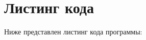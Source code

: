 \section*{Листинг кода}
Ниже представлен листинг кода программы:
\begin{figure}[h]
	\label{ris:image1}
\end{figure}
\begin{figure}[h]
	\label{ris:image1}
\end{figure}
\newpage
\begin{figure}[h]
	\label{ris:image1}
\end{figure}

